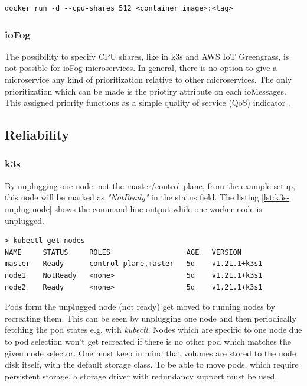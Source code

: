 \begin{lstlisting}[caption={Running Docker container with less shares than the default \cite{DockerDocsResourceConstraints}.},label={lst:aws-service-differentation},captionpos=b]
docker run -d --cpu-shares 512 <container_image>:<tag>
\end{lstlisting}
    
\subsubsection*{ioFog}
The possibility to specify CPU shares, like in k3s and AWS IoT Greengrass, is not possible for ioFog microservices. In general, there is no option to give a microservice any kind of prioritization relative to other microservices. The only prioritization which can be made is the priotiry attribute on each ioMessages. This assigned priority functions as a simple quality of service (QoS) indicator \cite{ioFogAgentReference}.
\subsection*{Reliability}
\subsubsection*{k3s}
By unplugging one node, not the master/control plane, from the example setup, this node will be marked as \textit{"NotReady"} in the status field. The listing \ref{lst:k3s-unplug-node} shows the command line output while one worker node is unplugged.

\begin{lstlisting}[caption={Status of node 1 while unplugged.},label={lst:k3s-unplug-node},captionpos=b]
> kubectl get nodes
NAME     STATUS     ROLES                  AGE   VERSION
master   Ready      control-plane,master   5d    v1.21.1+k3s1
node1    NotReady   <none>                 5d    v1.21.1+k3s1
node2    Ready      <none>                 5d    v1.21.1+k3s1
\end{lstlisting}

Pods form the unplugged node (not ready) get moved to running nodes by recreating them. This can be seen by unplugging one node and then periodically fetching the pod states e.g. with \textit{kubectl}. Nodes which are specific to one node due to pod selection won't get recreated if there is no other pod which matches the given node selector. One must keep in mind that volumes are stored to the node disk itself, with the default storage class. To be able to move pods, which require persistent storage, a storage driver with redundancy support must be used.

